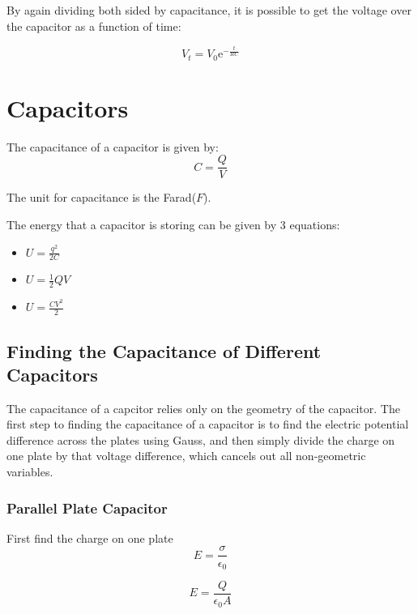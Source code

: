 \documentclass[a4paper,12pt]{article}
\begin{document}
						By again dividing both sided by capacitance, it is possible to get the voltage over the capacitor as a function of time:

						\begin{equation*}
								V_{t} =	V_{0}	\mathrm{e}^{-\frac{t}{RC}}
						\end{equation*}
	\section{Capacitors}
		The capacitance of a capacitor is given by:
			\begin{equation*}
					C = \frac{Q}{V} 
			\end{equation*}

		The unit for capacitance is the Farad($F$).

		The energy that a capacitor is storing can be given by 3 equations:
		\begin{itemize}
				\item $U = \frac{q^{2}}{2C}$
				\item $U = \frac{1}{2} QV$
				\item $U = \frac{CV^{2}}{2}$
		\end{itemize}

		\subsection{Finding the Capacitance of Different Capacitors}

			The capacitance of a capcitor relies only on the geometry of the capacitor. The first step to finding the capacitance of a capacitor is to find the electric potential difference across the plates using Gauss, and then simply divide the charge on one plate by that voltage difference, which cancels out all non-geometric variables.

			\subsubsection{Parallel Plate Capacitor}
				First find the charge on one plate
				\begin{equation*}
						E = \frac{\sigma}{\epsilon_{0}}
				\end{equation*}

				\begin{equation*}
						E = \frac{Q}{\epsilon_{0}A} 
				\end{equation*}
\end{document}
